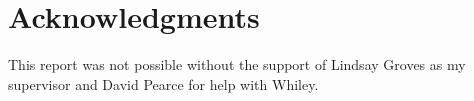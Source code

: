 \chapter*{Acknowledgments}\label{C:ack}


This report was not possible without the support of Lindsay Groves as my
supervisor and David Pearce for help with Whiley.

